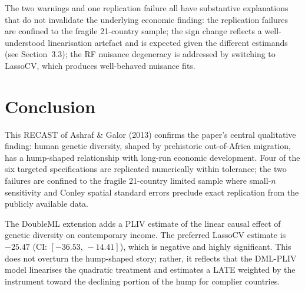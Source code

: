 \documentclass[12pt,letterpaper]{article}
\begin{document}
The two warnings and one replication failure all have substantive explanations
that do not invalidate the underlying economic finding:
the replication failures are confined to the fragile 21-country sample;
the sign change reflects a well-understood linearisation artefact and is expected
given the different estimands (see Section~3.3);
the RF nuisance degeneracy is addressed by switching to LassoCV, which produces
well-behaved nuisance fits.

\section{Conclusion}

This RECAST of Ashraf \& Galor (2013) confirms the paper's central qualitative
finding: human genetic diversity, shaped by prehistoric out-of-Africa migration,
has a hump-shaped relationship with long-run economic development.
Four of the six targeted specifications are replicated numerically within tolerance;
the two failures are confined to the fragile 21-country limited sample where
small-$n$ sensitivity and Conley spatial standard errors preclude exact replication
from the publicly available data.

The DoubleML extension adds a PLIV estimate of the linear causal effect of
genetic diversity on contemporary income.
The preferred LassoCV estimate is $-25.47$ (CI: $[-36.53,\,-14.41]$), which is
negative and highly significant.
This does not overturn the hump-shaped story; rather, it reflects that the
DML-PLIV model linearises the quadratic treatment and estimates a LATE weighted
by the instrument toward the declining portion of the hump for complier countries.
\end{document}
